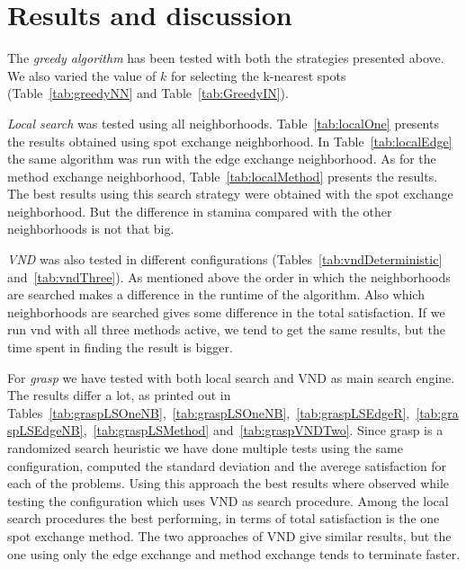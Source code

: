 \documentclass{article}
\begin{document}
\section{Results and discussion}


The \emph{greedy algorithm} has been tested with both the strategies presented above. 
We also varied the value of $k$ for selecting the k-nearest spots (Table~\ref{tab:greedyNN} and Table~\ref{tab:GreedyIN}).
\medskip

\emph{Local search} was tested using all neighborhoods. Table~\ref{tab:localOne} presents the results obtained using spot exchange neighborhood. 
In Table~\ref{tab:localEdge} the same algorithm was run with the edge exchange neighborhood. As for the method exchange neighborhood, Table~\ref{tab:localMethod} presents the results. The best results using this search strategy were obtained with the spot exchange neighborhood. But the difference in stamina compared with the other neighborhoods is not that big. 
\medskip

\emph{VND} was also tested in different configurations (Tables~\ref{tab:vndDeterministic} and~\ref{tab:vndThree}). As mentioned above the order in which the neighborhoods are searched makes a difference in the runtime of the algorithm. Also which neighborhoods are searched gives some difference in the total satisfaction. If we run vnd with all three methods active, we tend to get the same results, but the time spent in finding the result is bigger.  
\medskip

For \emph{grasp} we have tested with both local search and VND as main search engine. The results differ a lot, as printed out in
Tables~\ref{tab:graspLSOneNB},~\ref{tab:graspLSOneNB},~\ref{tab:graspLSEdgeR},~\ref{tab:graspLSEdgeNB},~\ref{tab:graspLSMethod}
and~\ref{tab:graspVNDTwo}. Since grasp is a randomized search heuristic we have done multiple tests using the same configuration, 
computed the standard deviation and the averege satisfaction for each of the problems. Using this approach the best results where observed while testing the configuration which uses VND as search procedure. Among the local search procedures the best performing, in terms of total satisfaction is the one spot exchange method. The two approaches of VND give similar results, but the one using only the edge exchange and method exchange tends to terminate faster. 
\medskip
\end{document}
